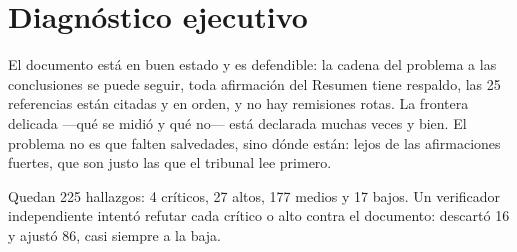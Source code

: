 \section{Diagnóstico ejecutivo}
El documento está en buen estado y es defendible: la cadena del problema a las conclusiones se puede seguir, toda afirmación del Resumen tiene respaldo, las 25 referencias están citadas y en orden, y no hay remisiones rotas. La frontera delicada —qué se midió y qué no— está declarada muchas veces y bien. El problema no es que falten salvedades, sino dónde están: lejos de las afirmaciones fuertes, que son justo las que el tribunal lee primero.\par
Quedan 225 hallazgos: 4 críticos, 27 altos, 177 medios y 17 bajos. Un verificador independiente intentó refutar cada crítico o alto contra el documento: descartó 16 y ajustó 86, casi siempre a la baja.\par
